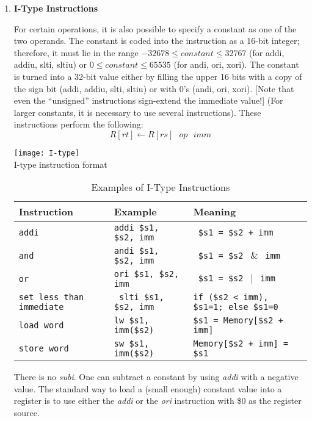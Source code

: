 \documentclass[12pt]{report}
\begin{document}
\begin{enumerate}
 \item \textbf{I-Type Instructions}
 
 For certain operations, it is also possible to specify a constant as one of the two operands. The
constant is coded into the instruction as a 16-bit integer; therefore, it must lie in the range
$-32678 \leq constant \leq 32767$ (for addi, addiu, slti, sltiu) or $0 \leq constant \leq 65535$ (for andi,
ori, xori). The constant is turned into a 32-bit value either by filling the upper 16 bits with a
copy of the sign bit (addi, addiu, slti, sltiu) or with 0’s (andi, ori, xori). [Note that even
the “unsigned” instructions sign-extend the immediate value!] (For larger constants, it is
necessary to use several instructions).
These instructions perform the following:
\begin{equation*}
R[rt] \leftarrow R[rs] ~~~op~~~ imm
\end{equation*}

\begin{center}
\texttt{[image: I-type]}\\
I-type instruction format
\end{center}

\begin{longtable}{|p{4cm}|p{5cm}|p{5cm}|}
\caption{Examples of I-Type Instructions} \label{tab:examples_i_type} \\
\hline
Instruction &Example&Meaning\\\hline
\texttt{addi}&\texttt{addi \$s1, \$s2, imm }&\texttt{ \$s1 = \$s2 + imm}\\\hline
\texttt{and}&\texttt{andi \$s1, \$s2, imm }&\texttt{ \$s1 = \$s2 $~\&~$ imm}\\\hline
\texttt{or}&\texttt{ori \$s1, \$s2, imm }&\texttt{ \$s1 = \$s2 $~\vert~$ imm}\\\hline
\texttt{set less than immediate}&\texttt{ slti \$s1, \$s2, imm}&\texttt{if (\$s2 < imm), \$s1=1;
 else \$s1=0}\\\hline
 \texttt{load word}&\texttt{lw \$s1, imm(\$s2)}&\texttt{\$s1 = Memory[\$s2 + imm]}\\\hline
 \texttt{store word}&\texttt{sw \$s1, imm(\$s2)}&\texttt{Memory[\$s2 + imm] = \$s1}\\\hline
\end{longtable}

There is no \textit{subi}. One can subtract a constant by using \textit{addi} with a negative value. 
The standard way to load a (small enough) constant value into a register is to use either
the \textit{addi} or the \textit{ori} instruction with \$0 as the register source.


\end{enumerate}
\end{document}
